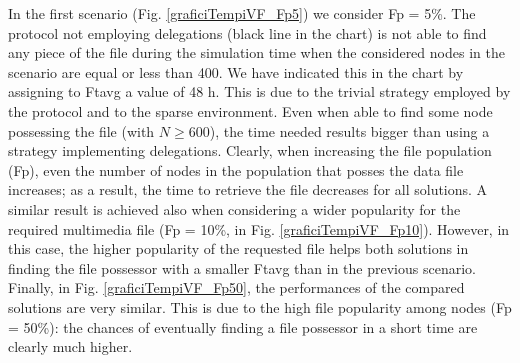 In the first scenario (Fig. \ref{graficiTempiVF_Fp5}) we consider Fp = 5\%. The protocol not employing delegations (black line in the chart) is not able to find any piece of the file during the simulation time when the considered nodes in the scenario are equal or less than 400. We have indicated this in the chart by assigning to Ftavg a value of 48 h. This is due to the trivial strategy employed by the protocol and to the sparse environment. Even when able to find some node possessing the file (with $N \geq 600$), the time needed results bigger than using a strategy implementing delegations. Clearly, when increasing the file population (Fp), even the number of nodes in the population that posses the data file increases; as a result, the time to retrieve the file decreases for all solutions. A similar result is achieved also when considering a wider popularity for the required multimedia file (Fp = 10\%, in Fig. \ref{graficiTempiVF_Fp10}). However, in this case, the higher popularity of the requested file helps both solutions in finding the file possessor with a smaller Ftavg than in the previous scenario.  Finally, in Fig. \ref{graficiTempiVF_Fp50}, the performances of the compared solutions are very similar. This is due to the high file popularity among nodes (Fp = 50\%): the chances of eventually finding a file possessor in a short time are clearly much higher.

